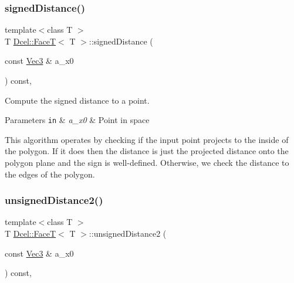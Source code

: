 \subsubsection{\texorpdfstring{signed\+Distance()}{signedDistance()}}
{\footnotesize\ttfamily template$<$class T $>$ \\
T \hyperlink{classDcel_1_1FaceT}{Dcel\+::\+FaceT}$<$ T $>$\+::signed\+Distance (\begin{DoxyParamCaption}\item[{const \hyperlink{classDcel_1_1FaceT_ade9c182834ec6f18a0e17b8140308db2}{Vec3} \&}]{a\+\_\+x0 }\end{DoxyParamCaption}) const\hspace{0.3cm}{\ttfamily [inline]}, {\ttfamily [noexcept]}}



Compute the signed distance to a point. 


\begin{DoxyParams}[1]{Parameters}
\mbox{\tt in}  & {\em a\+\_\+x0} & Point in space\\
\hline
\end{DoxyParams}
This algorithm operates by checking if the input point projects to the inside of the polygon. If it does then the distance is just the projected distance onto the polygon plane and the sign is well-\/defined. Otherwise, we check the distance to the edges of the polygon. \mbox{\label{classDcel_1_1FaceT_a2915506b12c361eb4a25cba80638cb7d}} 
\subsubsection{\texorpdfstring{unsigned\+Distance2()}{unsignedDistance2()}}
{\footnotesize\ttfamily template$<$class T $>$ \\
T \hyperlink{classDcel_1_1FaceT}{Dcel\+::\+FaceT}$<$ T $>$\+::unsigned\+Distance2 (\begin{DoxyParamCaption}\item[{const \hyperlink{classDcel_1_1FaceT_ade9c182834ec6f18a0e17b8140308db2}{Vec3} \&}]{a\+\_\+x0 }\end{DoxyParamCaption}) const\hspace{0.3cm}{\ttfamily [inline]}, {\ttfamily [noexcept]}}



